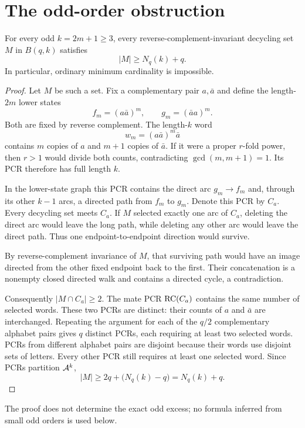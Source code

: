 \section{The odd-order obstruction}
\label{sec:odd}

\begin{theorem}
\label{thm:odd}
For every odd $k=2m+1\geq3$, every reverse-complement-invariant decycling
set $M$ in $B(q,k)$ satisfies
\[
  |M|\geq N_q(k)+q.
\]
In particular, ordinary minimum cardinality is impossible.
\end{theorem}

\begin{proof}
Let $M$ be such a set. Fix a complementary pair $a,\bar a$ and define the
length-$2m$ lower states
\[
  f_m=(a\bar a)^m,\qquad g_m=(\bar a a)^m.
\]
Both are fixed by reverse complement.  The length-$k$ word
\[
  w_m=(a\bar a)^m\bar a
\]
contains $m$ copies of $a$ and $m+1$ copies of $\bar a$.  If it were a
proper $r$-fold power, then $r>1$ would divide both counts, contradicting
$\gcd(m,m+1)=1$.  Its PCR therefore has full length $k$.

In the lower-state graph this PCR contains the direct arc $g_m\to f_m$ and,
through its other $k-1$ arcs, a directed path from $f_m$ to $g_m$.  Denote
this PCR by $C_a$. Every decycling set meets $C_a$. If $M$ selected exactly
one arc of $C_a$, deleting the direct arc would leave the long path, while
deleting any other arc would leave the direct path. Thus one
endpoint-to-endpoint direction would survive.

By reverse-complement invariance of $M$, that surviving path would have an
image directed from the other fixed endpoint back to the first.
Their concatenation is a nonempty closed directed walk and contains a
directed cycle, a contradiction.

Consequently $|M\cap C_a|\geq2$. The mate PCR $\operatorname{RC}(C_a)$ contains the
same number of selected words. These two PCRs are distinct: their counts of
$a$ and $\bar a$ are interchanged. Repeating the argument for each of the
$q/2$ complementary alphabet pairs gives $q$ distinct PCRs, each requiring
at least two selected words. PCRs from different alphabet pairs are disjoint
because their words use disjoint sets of letters. Every other PCR still
requires at least one selected word. Since PCRs partition $\mathcal A^k$,
\[
  |M|\geq 2q+\bigl(N_q(k)-q\bigr)=N_q(k)+q.
\]
\end{proof}

The proof does not determine the exact odd excess; no formula inferred from
small odd orders is used below.
